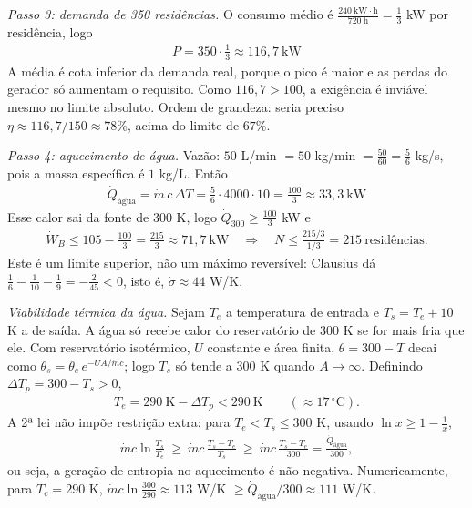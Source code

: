 \documentclass{article}%
\begin{document}
\textit{Passo 3: demanda de 350 residências.} O consumo médio é $\frac{240\ \text{kW}\cdot\text{h}}{720\ \text{h}}=\frac13$ kW por residência, logo
\begin{align*}
P=350\cdot\frac13\approx 116{,}7\ \text{kW}
\end{align*}
A média é cota inferior da demanda real, porque o pico é maior e as perdas do gerador só aumentam o requisito. Como $116{,}7>100$, a exigência é inviável mesmo no limite absoluto. Ordem de grandeza: seria preciso $\eta\approx 116{,}7/150\approx 78\%$, acima do limite de $67\%$.

\textit{Passo 4: aquecimento de água.} Vazão: $50$ L/min $=50$ kg/min $=\frac{50}{60}=\frac56$ kg/s, pois a massa específica é $1$ kg/L. Então
\begin{align*}
\dot Q_{\text{água}}=\dot m\,c\,\Delta T=\frac56\cdot4000\cdot10=\frac{100}{3}\approx 33{,}3\ \text{kW}
\end{align*}
Esse calor sai da fonte de 300 K, logo $\dot Q_{300}\ge\frac{100}{3}$ kW e
\begin{align*}
\dot W_B\le 105-\frac{100}{3}=\frac{215}{3}\approx 71{,}7\ \text{kW}\quad\Rightarrow\quad N\le\frac{215/3}{1/3}=215\ \text{residências}.
\end{align*}
Este é um limite superior, não um máximo reversível: Clausius dá $\frac16-\frac1{10}-\frac19=-\frac2{45}<0$, isto é, $\dot\sigma\approx 44$ W/K.

\textit{Viabilidade térmica da água.} Sejam $T_e$ a temperatura de entrada e $T_s=T_e+10$ K a de saída. A água só recebe calor do reservatório de 300 K se for mais fria que ele. Com reservatório isotérmico, $U$ constante e área finita, $\theta=300-T$ decai como $\theta_s=\theta_e\,e^{-UA/\dot m c}$; logo $T_s$ só tende a 300 K quando $A\to\infty$. Definindo $\Delta T_p=300-T_s>0$,
\begin{align*}
T_e=290\ \text{K}-\Delta T_p<290\ \text{K}\qquad(\approx 17\,^\circ\text{C}).
\end{align*}
A 2ª lei não impõe restrição extra: para $T_e<T_s\le300$ K, usando $\ln x\ge1-\frac1x$,
\begin{align*}
\dot m c\ln\frac{T_s}{T_e}\ \ge\ \dot m c\,\frac{T_s-T_e}{T_s}\ \ge\ \dot m c\,\frac{T_s-T_e}{300}=\frac{\dot Q_{\text{água}}}{300},
\end{align*}
ou seja, a geração de entropia no aquecimento é não negativa. Numericamente, para $T_e=290$ K, $\dot m c\ln\frac{300}{290}\approx 113$ W/K $\ge \dot Q_{\text{água}}/300\approx 111$ W/K.
\end{document}
